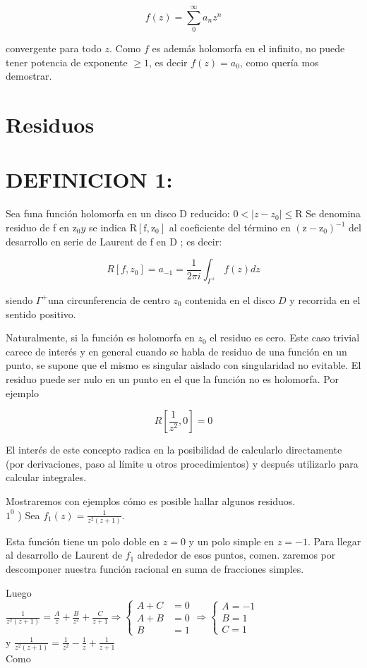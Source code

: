 \documentclass[10pt]{article}
\theoremstyle{plain}
\theoremstyle{definition}
\theoremstyle{remark}
\begin{document}
$$
f(z)=\sum_{0}^{\infty} a_{n} z^{n}
$$

convergente para todo $z$. Como $f$ es además holomorfa en el infinito, no puede tener potencia de exponente $\geqslant 1$, es decir $f(z)=a_{0}$, como quería mos demostrar.

\section{Residuos}
\section*{DEFINICION 1:}
Sea funa función holomorfa en un disco D reducido: $0<\left|z-z_{0}\right| \leqslant \mathrm{R}$ Se denomina residuo de f en $\mathrm{z}_0 y$ se indica $\mathrm{R}\left[\mathrm{f}, \mathrm{z}_0\right]$ al coeficiente del término en $\left(\mathrm{z}-\mathrm{z}_0\right)^{-1}$ del desarrollo en serie de Laurent de f en D ; es decir:


\begin{equation*}
R\left[f, z_{0}\right]=a_{-1}=\frac{1}{2 \pi i} \int_{\Gamma^{+}} f(z) d z \tag{20-1}
\end{equation*}


siendo $\Gamma^{+}$una circunferencia de centro $z_{0}$ contenida en el disco $D$ y recorrida en el sentido positivo.

Naturalmente, si la función es holomorfa en $z_{0}$ el residuo es cero. Este caso trivial carece de interés y en general cuando se habla de residuo de una función en un punto, se supone que el mismo es singular aislado con singularidad no evitable. El residuo puede ser nulo en un punto en el que la función no es holomorfa. Por ejemplo

$$
R\left[\frac{1}{z^{2}}, 0\right]=0
$$

El interés de este concepto radica en la posibilidad de calcularlo directamente (por derivaciones, paso al límite u otros procedimientos) y después utilizarlo para calcular integrales.

Mostraremos con ejemplos cómo es posible hallar algunos residuos.\\
$1^{0}$ ) Sea $f_{1}(z)=\frac{1}{z^{2}(z+1)}$.

Esta función tiene un polo doble en $z=0$ y un polo simple en $z=-1$. Para llegar al desarrollo de Laurent de $f_{1}$ alrededor de esos puntos, comen. zaremos por descomponer nuestra función racional en suma de fracciones simples.

Luego\\
$\frac{1}{z^{2}(z+1)}=\frac{A}{z}+\frac{B}{z^{2}}+\frac{C}{z+1} \Longrightarrow\left\{\begin{aligned} A+C & =0 \\ A+B & =0 \\ B & =1\end{aligned} \Longrightarrow\left\{\begin{array}{c}A=-1 \\ B=1 \\ C=1\end{array}\right.\right.$\\
y $\frac{1}{z^{2}(z+1)}=\frac{1}{z^{2}}-\frac{1}{z}+\frac{1}{z+1}$\\
Como
\end{document}

